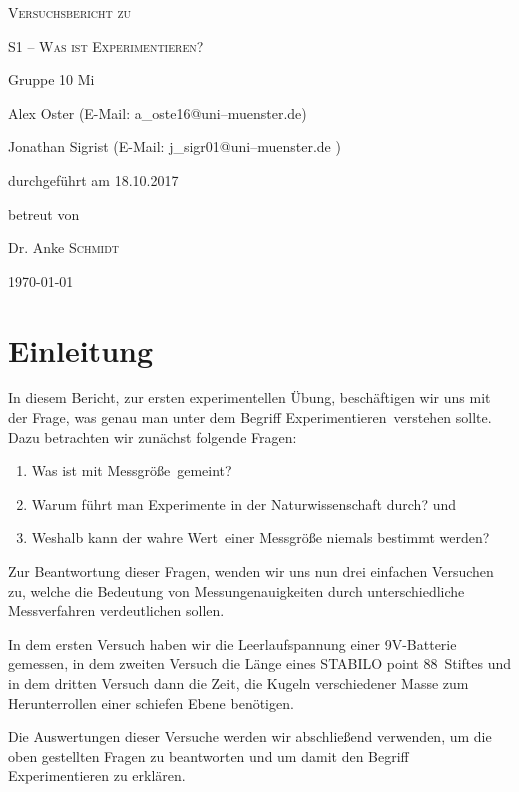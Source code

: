 \documentclass[11pt,a4paper,titlepage, ngerman]{article}
\begin{document}
	
	\begin{titlepage}
		\centering
			{\scshape\LARGE Versuchsbericht zu \par}
		\vspace{1cm}
			{\scshape\huge S1 -- Was ist Experimentieren?\par}
		\vspace{2.5cm}
			{\LARGE Gruppe 10 Mi\par}
		\vspace{0.5cm}
			{\large Alex Oster (E-Mail: a\_oste16@uni--muenster.de) \par}
			{\large Jonathan Sigrist (E-Mail: j\_sigr01@uni--muenster.de ) \par}
		\vfill
			durchgeführt am 18.10.2017\par
			betreut von\par
			{\large Dr. Anke \textsc{Schmidt}}		
		\vfill		
			{\large \today\par}
	\end{titlepage}	
	
	\tableofcontents	
	\newpage
		
	\section{Einleitung}
		\label{Einleitung}		
		In diesem Bericht, zur ersten experimentellen Übung, beschäftigen wir uns mit der Frage, was genau man unter dem Begriff \glqq Experimentieren\grqq\ verstehen sollte. Dazu betrachten wir zunächst folgende Fragen:	
		\begin{enumerate}			
			\item Was ist mit \glqq Messgröße\grqq\ gemeint?
			\item Warum führt man Experimente in der Naturwissenschaft durch? und
			\item Weshalb kann der \glqq wahre Wert\grqq\ einer Messgröße niemals bestimmt werden?			
		\end{enumerate}			
			Zur Beantwortung dieser Fragen, wenden wir uns nun drei einfachen Versuchen zu, welche die Bedeutung von Messungenauigkeiten durch unterschiedliche Messverfahren verdeutlichen sollen. 
			
			In dem ersten Versuch haben wir die Leerlaufspannung einer 9V-Batterie gemessen, in dem zweiten Versuch die Länge eines \glqq STABILO point 88\grqq\ Stiftes und in dem dritten Versuch dann die Zeit, die Kugeln verschiedener Masse zum Herunterrollen einer schiefen Ebene benötigen.
						
			Die Auswertungen dieser Versuche werden wir abschließend verwenden, um die oben gestellten Fragen zu beantworten und um damit den Begriff \glqq Experimentieren\grqq {} zu erklären.
	
\end{document}
